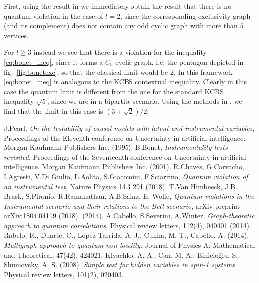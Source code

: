 \documentclass[floatfix, twocolumn, aps, prl]{revtex4-1}
\begin{document}
First, using the result in \cite{cabello2014} we immediately obtain the result
that there is no quantum violation in the case of $l=2$, since the corresponding
exclusivity graph (and its complement) does not contain any odd cyclic graph
with more than $5$ vertices.  

For $l\ge3$ instead we see that there is a violation for the inequality \eqref{eq:bonet_ineq},
since it forms a $C_5$ cyclic graph, i.e. the pentagon depicted in
fig.~\ref{fig:bonetexc}, so that the classical limit would be $2$.
In this framework \eqref{eq:bonet_ineq} is analogous to the KCBS contextual
inequality.
Clearly in this case the quantum limit is different from the one for the standard KCBS
inequality $\sqrt{5}$, since we are in a bipartite scenario.
Using the methods in \cite{rabelo2014}, we find that the limit in this case is $(3+\sqrt{2})/2$.

\begin{thebibliography}{}
     J.Pearl, {\em On the testability of causal models with
        latent and instrumental variables}, 
        Proceedings of the Eleventh conference on Uncertainty in artificial
        intelligence. Morgan Kaufmann Publishers Inc. (1995).
     B.Bonet, {\em Instrumentality tests revisited},
        Proceedings of the Seventeenth conference on Uncertainty in artificial
        intelligence. Morgan Kaufmann Publishers Inc. (2001).
     R.Chaves, G.Carvacho, I.Agresti, V.Di Giulio, L.Aolita,
        S.Giacomini, F.Sciarrino, 
        {\em Quantum violation of an instrumental test}, 
        Nature Physics 14.3 291 (2018).
      T.Van Himbeeck, J.B. Brask, S.Pironio, R.Ramanathan, A.B.Sainz, E. Wolfe, 
        {\em Quantum violations in the Instrumental scenario and their relations to the Bell scenario},
        arXiv preprint arXiv:1804.04119 (2018).
         (2014).
      A.Cabello, S.Severini, A.Winter,
         {\em Graph-theoretic approach to quantum correlations}, 
         Physical review letters, 112(4), 040401 (2014).
      Rabelo, R., Duarte, C., López-Tarrida, A. J., Cunha, M. T., Cabello, A. (2014). {\em Multigraph approach to quantum non-locality.} Journal of Physics A: Mathematical and Theoretical, 47(42), 424021.
      Klyachko, A. A., Can, M. A., Binicioğlu, S., Shumovsky, A. S. (2008). {\em Simple test for hidden variables in spin-1 systems.} Physical review letters, 101(2), 020403.
     
\end{thebibliography}
\end{document}
